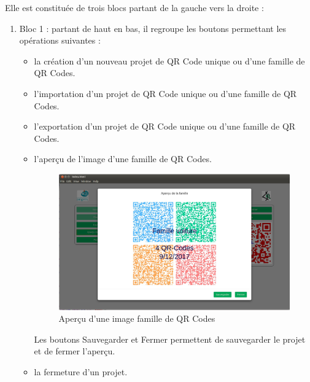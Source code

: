 \par
Elle est constituée de trois blocs partant de la gauche vers la droite : 
\begin{enumerate}
\item Bloc 1 : partant de haut en bas, il regroupe les boutons permettant les opérations suivantes :
	\begin{itemize}
	\item la création d'un nouveau projet de QR Code unique ou d'une famille de QR Codes.
	\item l'importation d'un projet de QR Code unique ou d'une famille de QR Codes.
	\item l'exportation d'un projet de QR Code unique ou d'une famille de QR Codes.
	\item l'aperçu de l'image d'une famille de QR Codes.

\begin{figure}[!h]
			\centering
		   	\includegraphics[scale=0.25]{img/image-famille.png}
		   	\caption{Aperçu d'une image famille de QR Codes}
		\end{figure}
	
	Les boutons Sauvegarder et Fermer permettent de sauvegarder le projet et de fermer l'aperçu.\\
	\item la fermeture d'un projet.
	\end{itemize}


\end{enumerate}
